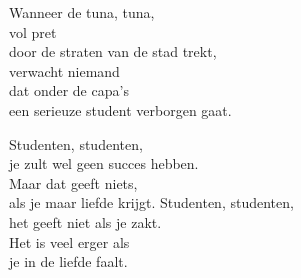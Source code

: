 \clearpage
\begin{translation}
Wanneer de tuna, tuna,\\
vol pret\\
door de straten van de stad trekt,\\
verwacht niemand\\
dat onder de capa's\\
een serieuze student verborgen gaat.\vspace{\wlskip}

Studenten, studenten,\\
je zult wel geen succes hebben.\\
Maar dat geeft niets,\\
als je maar liefde krijgt.\vspace{\wlskip}
Studenten, studenten,\\
het geeft niet als je zakt.\\
Het is veel erger als\\
je in de liefde faalt.\\
\end{translation}

